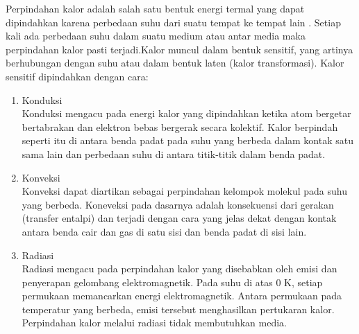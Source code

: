 
Perpindahan kalor adalah salah satu bentuk energi termal yang dapat dipindahkan karena perbedaan suhu dari suatu tempat ke tempat lain \cite{HeatTransferIncropera}. Setiap kali ada perbedaan suhu dalam suatu medium atau antar media maka perpindahan kalor pasti terjadi.Kalor muncul dalam bentuk sensitif, yang artinya berhubungan dengan suhu atau dalam bentuk laten (kalor transformasi). Kalor sensitif dipindahkan dengan cara: \cite{BuildingPhysics}

\begin{enumerate}
	\item Konduksi \\
	Konduksi mengacu pada energi kalor yang dipindahkan ketika atom bergetar bertabrakan dan elektron bebas bergerak secara kolektif. Kalor berpindah seperti itu di antara benda padat pada suhu yang berbeda dalam kontak satu sama lain dan perbedaan suhu di antara titik-titik dalam benda padat.
	\item Konveksi \\
	Konveksi dapat diartikan sebagai perpindahan kelompok molekul pada suhu yang berbeda. Koneveksi pada dasarnya adalah konsekuensi dari gerakan (transfer entalpi) dan terjadi dengan cara yang jelas dekat dengan kontak antara benda cair dan gas di satu sisi dan benda padat di sisi lain.
	\item Radiasi \\
	Radiasi mengacu pada perpindahan kalor yang disebabkan oleh emisi dan penyerapan gelombang elektromagnetik. Pada suhu di atas 0 K, setiap permukaan memancarkan energi elektromagnetik. Antara permukaan pada temperatur yang berbeda, emisi tersebut menghasilkan pertukaran kalor. Perpindahan kalor melalui radiasi tidak membutuhkan media.
\end{enumerate}

